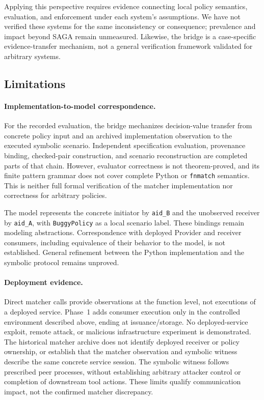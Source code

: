 Applying this perspective requires evidence connecting local policy semantics,
evaluation, and enforcement under each system's assumptions. We have not
verified these systems for the same inconsistency or consequence; prevalence
and impact beyond SAGA remain unmeasured. Likewise, the bridge is a
case-specific evidence-transfer mechanism, not a general verification
framework validated for arbitrary systems.


\subsection{Limitations}

\paragraph{Implementation-to-model correspondence.}
For the recorded evaluation, the bridge mechanizes decision-value transfer
from concrete policy input and an archived implementation observation to
the executed symbolic scenario. Independent specification evaluation,
provenance binding, checked-pair construction, and scenario reconstruction
are completed parts of that chain. However, evaluator correctness is not
theorem-proved, and its finite pattern grammar does not cover complete
Python or \texttt{fnmatch} semantics. This is neither full formal verification
of the matcher implementation nor correctness for arbitrary policies.

The model represents the concrete initiator by \texttt{aid\_B} and the
unobserved receiver by \texttt{aid\_A}, with \texttt{BuggyPolicy} as a local
scenario label. These bindings remain modeling abstractions. Correspondence
with deployed Provider and receiver consumers, including equivalence of
their behavior to the model, is not established. General refinement between
the Python implementation and the symbolic protocol remains unproved.

\paragraph{Deployment evidence.}
Direct matcher calls provide observations at the function level, not
executions of a deployed service. Phase~1 adds consumer execution only in
the controlled environment described above, ending at issuance/storage.
No deployed-service exploit, remote attack, or malicious infrastructure
experiment is demonstrated. The historical matcher archive
does not identify deployed receiver or policy ownership, or establish that
the matcher observation and symbolic witness describe the same concrete
service session. The symbolic witness follows prescribed peer
processes, without establishing arbitrary attacker control or completion of
downstream tool actions. These limits qualify communication impact, not the
confirmed matcher discrepancy.

